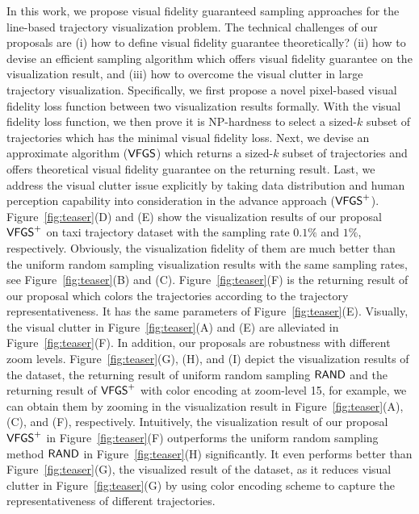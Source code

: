 In this work, we propose visual fidelity guaranteed sampling approaches for the line-based trajectory visualization problem.
The technical challenges of our proposals are
(i) how to define visual fidelity guarantee theoretically?
(ii) how to devise an efficient sampling algorithm which offers visual fidelity guarantee on the visualization result,
and (iii) how to overcome the visual clutter in large trajectory visualization.
Specifically, we first propose a novel pixel-based visual fidelity loss function between two visualization results formally.
With the visual fidelity loss function, we then prove it is NP-hardness to select a sized-$k$ subset of trajectories which has the minimal visual fidelity loss.
Next, we devise an approximate algorithm ($\mathsf{VFGS}$) which returns a sized-$k$ subset of trajectories and offers theoretical visual fidelity guarantee on the returning result.
Last, we address the visual clutter issue explicitly by taking data distribution and human perception capability into consideration in the advance approach ($\mathsf{VFGS}^{+}$).
Figure~\ref{fig:teaser}(D) and (E) show the visualization results of our proposal $\mathsf{VFGS}^{+}{}$ on \pt{} taxi trajectory dataset with {the} sampling rate $0.1\%$ and $1\%$, respectively.
Obviously, the visualization fidelity of them are much better than the uniform random sampling visualization results with the same sampling rates, see Figure~\ref{fig:teaser}(B) and (C).
Figure~\ref{fig:teaser}(F) is the returning result of our proposal which colors the trajectories {according to the trajectory representativeness}.
It has the same parameters of Figure~\ref{fig:teaser}(E).
Visually, the visual clutter in Figure~\ref{fig:teaser}(A) and (E) are alleviated in Figure~\ref{fig:teaser}(F).
In addition, our proposals are robustness with different zoom levels.
Figure~\ref{fig:teaser}(G), (H), and (I) depict the visualization results of the \pt{} dataset, the returning result of uniform random sampling $\mathsf{RAND}$ and the returning result of $\mathsf{VFGS}^{+}$ with color encoding at zoom-level 15, for example, we can obtain them by zooming in the visualization result in Figure~\ref{fig:teaser}(A), (C), and (F), respectively.
Intuitively, the visualization result of our proposal $\mathsf{VFGS}^{+}$ in Figure~\ref{fig:teaser}(F) outperforms the uniform random sampling method $\mathsf{RAND}$ in Figure~\ref{fig:teaser}(H) significantly.
It even performs better than Figure~\ref{fig:teaser}(G), the visualized result of the \pt{} dataset, as it reduces visual clutter in Figure~\ref{fig:teaser}(G) by using color encoding scheme to capture the representativeness of different trajectories.

